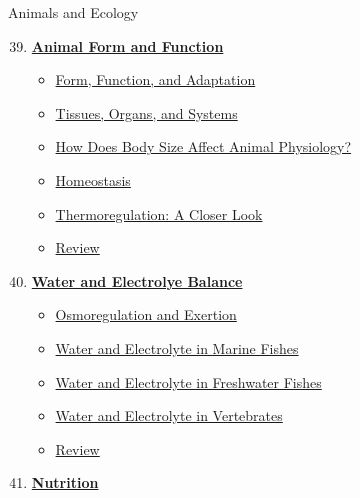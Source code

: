 \documentclass[12pt,letterpaper]{article}
\begin{document}

\begin{chapbox}{Animals and Ecology}{ 
\begin{enumerate}[font=\bfseries, wide]
    \setcounter{enumi}{38}
\item \hyperlink{39}{\textbf{Animal Form and Function}}
    \begin{itemize}
        \item \hyperlink{39.1}{Form, Function, and Adaptation}
        \item \hyperlink{39.2}{Tissues, Organs, and Systems}
        \item \hyperlink{39.3}{How Does Body Size Affect Animal Physiology?}
        \item \hyperlink{39.4}{Homeostasis}
        \item \hyperlink{39.5}{Thermoregulation: A Closer Look}
        \item \hyperlink{39.r}{Review}
    \end{itemize}
\item \hyperlink{40}{\textbf{Water and Electrolye Balance}}
    \begin{itemize}
        \item \hyperlink{40.1}{Osmoregulation and Exertion}
        \item \hyperlink{40.2}{Water and Electrolyte in Marine Fishes}
        \item \hyperlink{40.3}{Water and Electrolyte in Freshwater Fishes}
        \item \hyperlink{40.5}{Water and Electrolyte in Vertebrates}
        \item \hyperlink{40.r}{Review}
    \end{itemize}
\item \hyperlink{41}{\textbf{Nutrition}}

\end{enumerate}}
\end{chapbox}
\end{document}
